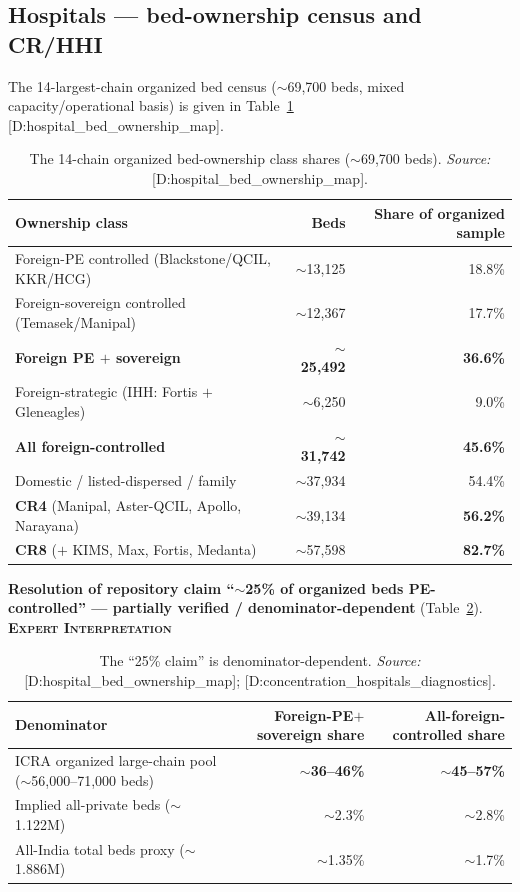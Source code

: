 \documentclass[11pt,a4paper]{article}
\newcommand{\EI}{\textcolor{eicol}{\textsc{\textbf{Expert Interpretation}}}}
\newcommand{\cs}[1]{\textnormal{[#1]}}
\begin{document}
\subsection{Hospitals --- bed-ownership census and CR/HHI}

The 14-largest-chain organized bed census ($\sim$69{,}700 beds, mixed capacity/operational basis) is given in Table~\ref{tab:bedcensus} \cs{D:hospital\_bed\_ownership\_map}.

\begin{table}[htbp]
\centering
\small
\caption{The 14-chain organized bed-ownership class shares ($\sim$69{,}700 beds). \textit{Source:} \cs{D:hospital\_bed\_ownership\_map}.}
\label{tab:bedcensus}
\begin{tabularx}{\textwidth}{@{}>{\raggedright\arraybackslash}X r r@{}}
\toprule
\textbf{Ownership class} & \textbf{Beds} & \textbf{Share of organized sample} \\
\midrule
Foreign-PE controlled (Blackstone/QCIL, KKR/HCG) & $\sim$13{,}125 & 18.8\% \\
Foreign-sovereign controlled (Temasek/Manipal) & $\sim$12{,}367 & 17.7\% \\
\textbf{Foreign PE $+$ sovereign} & \textbf{$\sim$25{,}492} & \textbf{36.6\%} \\
Foreign-strategic (IHH: Fortis $+$ Gleneagles) & $\sim$6{,}250 & 9.0\% \\
\textbf{All foreign-controlled} & \textbf{$\sim$31{,}742} & \textbf{45.6\%} \\
Domestic / listed-dispersed / family & $\sim$37{,}934 & 54.4\% \\
\midrule
\textbf{CR4} (Manipal, Aster-QCIL, Apollo, Narayana) & $\sim$39{,}134 & \textbf{56.2\%} \\
\textbf{CR8} ($+$ KIMS, Max, Fortis, Medanta) & $\sim$57{,}598 & \textbf{82.7\%} \\
\bottomrule
\end{tabularx}
\end{table}

\textbf{Resolution of repository claim ``$\sim$25\% of organized beds PE-controlled'' --- partially verified / denominator-dependent} (Table~\ref{tab:denominator}). \EI

\begin{table}[htbp]
\centering
\small
\caption{The ``25\% claim'' is denominator-dependent. \textit{Source:} \cs{D:hospital\_bed\_ownership\_map}; \cs{D:concentration\_hospitals\_diagnostics}.}
\label{tab:denominator}
\begin{tabularx}{\textwidth}{@{}>{\raggedright\arraybackslash}X r r@{}}
\toprule
\textbf{Denominator} & \textbf{Foreign-PE$+$sovereign share} & \textbf{All-foreign-controlled share} \\
\midrule
ICRA organized large-chain pool ($\sim$56{,}000--71{,}000 beds) & \textbf{$\sim$36--46\%} & \textbf{$\sim$45--57\%} \\
Implied all-private beds ($\sim$1.122M) & $\sim$2.3\% & $\sim$2.8\% \\
All-India total beds proxy ($\sim$1.886M) & $\sim$1.35\% & $\sim$1.7\% \\
\bottomrule
\end{tabularx}
\end{table}
\end{document}
